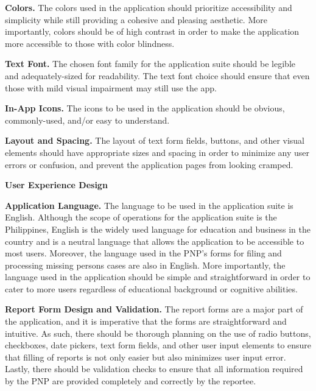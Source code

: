 \textbf{Colors.} The colors used in the application should prioritize accessibility and simplicity while still providing a cohesive and pleasing aesthetic. More importantly, colors should be of high contrast in order to make the application more accessible to those with color blindness.

\textbf{Text Font.} The chosen font family for the application suite should be legible and adequately-sized for readability. The text font choice should ensure that even those with mild visual impairment may still use the app.

\textbf{In-App Icons.} The icons to be used in the application should be obvious, commonly-used, and/or easy to understand.

\textbf{Layout and Spacing.} The layout of text form fields, buttons, and other visual elements should have appropriate sizes and spacing in order to minimize any user errors or confusion, and prevent the application pages from looking cramped.  

\textbf{User Experience Design}

\textbf{Application Language.} The language to be used in the application suite is English. Although the scope of operations for the application suite is the Philippines, English is the widely used language for education and business in the country and is a neutral language that allows the application to be accessible to most users. Moreover, the language used in the PNP's forms for filing and processing missing persons cases are also in English. More importantly, the language used in the application should be simple and straightforward in order to cater to more users regardless of educational background or cognitive abilities.

\textbf{Report Form Design and Validation.} 
The report forms are a major part of the application, and it is imperative that the forms are  straightforward and intuitive. As such, there should be thorough planning on the use of radio buttons, checkboxes, date pickers, text form fields, and other user input elements to ensure that filling of reports is not only easier but also minimizes user input error. Lastly, there should be validation checks to ensure that all information required by the PNP are provided completely and correctly by the reportee.